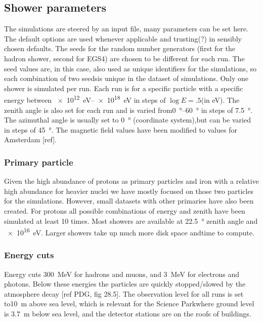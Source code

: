 \subsection{Shower parameters}

The simulations are steered by an input file, many parameters can be set here. The default options are used whenever applicable and trusting(?) in sensibly chosen defaults. The seeds for the random number generators (first for the hadron shower, second for EGS4) are chosen to be different for each run. The seed values are, in this case, also used as unique identifiers for the simulations, so each combination of two seedsis unique in the dataset of simulations. Only one shower is simulated per run. Each run is for a specific particle with a specific energy between \SIrange{e12}{e18}{\eV} in steps of $\log E = .5$(in eV). The zenith angle is also set for each run and is varied from\SIrange{0}{60}{\degree} in steps of \SI{7.5}{\degree}. The azimuthal angle is usually set to \SI{0}{\degree} (\hisparc coordinate system),but can be varied in steps of \SI{45}{\degree}. The magnetic field values have been modified to values for Amsterdam [ref].


\subsubsection{Primary particle}

Given the high abundance of protons as primary particles and iron with a relative high abundance for heavier nuclei we have mostly focused on those two particles for the simulations. However, small datasets with other primaries have also been created. For protons all possible combinations of energy and zenith have been simulated at least 10 times. Most showers are available at \SI{22.5}{\degree} zenith angle and \SI{e16}{\eV}. Larger showers take up much more disk space andtime to compute.


\subsubsection{Energy cuts}

Energy cuts \SI{300}{\MeV} for hadrons and muons, and \SI{3}{\MeV} for electrons and photons. Below these energies the particles are quickly stopped/slowed by the atmosphere decay [ref PDG, fig 28.5]. The observation level for all runs is set to\SI{10}{\meter} above sea level, which is relevant for the Science Parkwhere ground level is \SI{3.7}{\meter} below sea level, and the detector stations are on the roofs of buildings.



